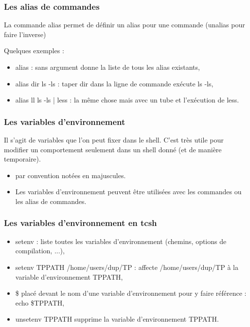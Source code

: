 \documentclass[handout,10pt]{beamer}
\begin{document}
\frame
{
    \frametitle{Les alias de commandes}

    La commande {\ttfamily alias} permet de définir un alias pour une commande ({\ttfamily unalias} pour faire l'inverse)

    Quelques exemples :

     \begin{itemize}
        \item {\ttfamily alias} : sans argument donne la liste de tous les alias existants,
        \item {\ttfamily alias dir ls -ls} : taper dir dans la ligne de commande exécute {\ttfamily ls -ls},
        \item {\ttfamily alias ll ls -ls | less}  : la même chose mais avec un tube et l'exécution de  {\ttfamily less}.
    \end{itemize}
}


\frame
{
    \frametitle{Les variables d'environnement}

    Il s'agit de variables que l'on peut fixer dans le shell. C'est très utile pour
    modifier un comportement seulement dans un shell donné (et de manière temporaire).

    \begin{itemize}
        \item par convention notées en majuscules.
        \item Les variables d'environnement peuvent être utilisées avec les commandes ou les alias de commandes.
    \end{itemize}
}


\frame
{
    \frametitle{Les variables d'environnement en tcsh}

    \begin{itemize}
        \item {\ttfamily setenv} : liste toutes les variables d'environnement (chemins, options de compilation, ...),
        \item {\ttfamily setenv TPPATH /home/users/dup/TP} : affecte {\ttfamily /home/users/dup/TP} à la variable d'environnement {\ttfamily TPPATH},
        \item {\ttfamily \$} placé devant le nom d'une variable d'environnement pour y faire référence : {\ttfamily echo \$TPPATH},
        \item {\ttfamily unsetenv TPPATH} supprime la variable d'environnement {\ttfamily TPPATH}.
    \end{itemize}
}
\end{document}
